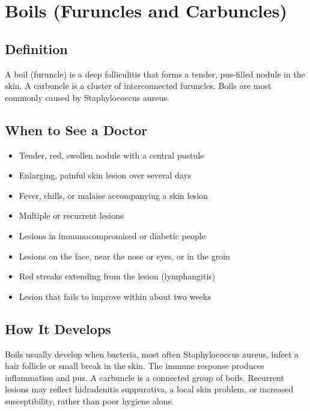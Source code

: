 \chapter{Boils (Furuncles and Carbuncles)}

\section*{Definition}
A boil (furuncle) is a deep folliculitis that forms a tender, pus-filled nodule in the skin. A carbuncle is a cluster of interconnected furuncles. Boils are most commonly caused by Staphylococcus aureus.

\section*{When to See a Doctor}
\begin{itemize}
\item Tender, red, swollen nodule with a central pustule
\item Enlarging, painful skin lesion over several days
\item Fever, chills, or malaise accompanying a skin lesion
\item Multiple or recurrent lesions
\item Lesions in immunocompromised or diabetic people
\item Lesions on the face, near the nose or eyes, or in the groin
\item Red streaks extending from the lesion (lymphangitis)
\item Lesion that fails to improve within about two weeks
\end{itemize}

\section*{How It Develops}
Boils usually develop when bacteria, most often Staphylococcus aureus, infect a hair follicle or small break in the skin. The immune response produces inflammation and pus. A carbuncle is a connected group of boils. Recurrent lesions may reflect hidradenitis suppurativa, a local skin problem, or increased susceptibility, rather than poor hygiene alone.

